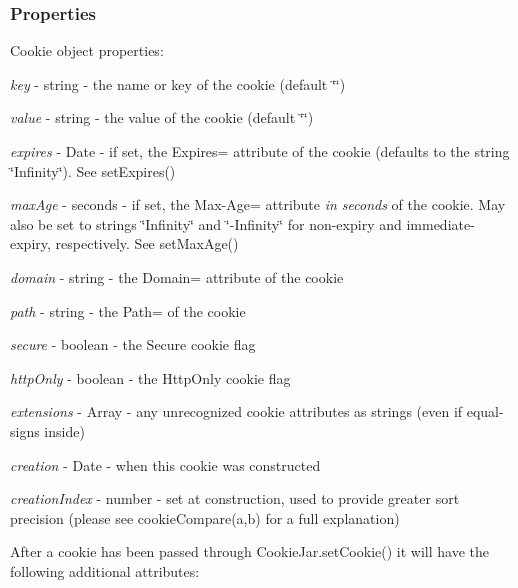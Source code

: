\subsubsection*{Properties}

Cookie object properties\+:


\begin{DoxyItemize}
\item {\itshape key} -\/ string -\/ the name or key of the cookie (default \char`\"{}\char`\"{})
\item {\itshape value} -\/ string -\/ the value of the cookie (default \char`\"{}\char`\"{})
\item {\itshape expires} -\/ {\ttfamily Date} -\/ if set, the {\ttfamily Expires=} attribute of the cookie (defaults to the string {\ttfamily \char`\"{}\+Infinity\char`\"{}}). See {\ttfamily set\+Expires()}
\item {\itshape max\+Age} -\/ seconds -\/ if set, the {\ttfamily Max-\/\+Age=} attribute {\itshape in seconds} of the cookie. May also be set to strings {\ttfamily \char`\"{}\+Infinity\char`\"{}} and {\ttfamily \char`\"{}-\/\+Infinity\char`\"{}} for non-\/expiry and immediate-\/expiry, respectively. See {\ttfamily set\+Max\+Age()}
\item {\itshape domain} -\/ string -\/ the {\ttfamily Domain=} attribute of the cookie
\item {\itshape path} -\/ string -\/ the {\ttfamily Path=} of the cookie
\item {\itshape secure} -\/ boolean -\/ the {\ttfamily Secure} cookie flag
\item {\itshape http\+Only} -\/ boolean -\/ the {\ttfamily Http\+Only} cookie flag
\item {\itshape extensions} -\/ {\ttfamily Array} -\/ any unrecognized cookie attributes as strings (even if equal-\/signs inside)
\item {\itshape creation} -\/ {\ttfamily Date} -\/ when this cookie was constructed
\item {\itshape creation\+Index} -\/ number -\/ set at construction, used to provide greater sort precision (please see {\ttfamily cookie\+Compare(a,b)} for a full explanation)
\end{DoxyItemize}

After a cookie has been passed through {\ttfamily Cookie\+Jar.\+set\+Cookie()} it will have the following additional attributes\+:



